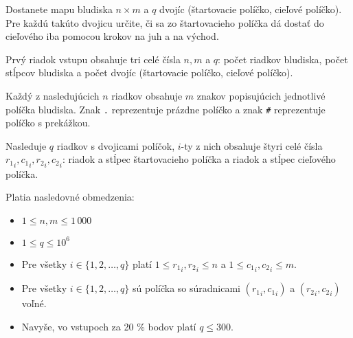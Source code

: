 

Dostanete mapu bludiska $n \times m$ a $q$ dvojíc (štartovacie políčko, cieľové políčko).
Pre každú takúto dvojicu určite, či sa zo štartovacieho políčka dá dostať do cieľového
iba pomocou krokov na juh a na východ.



Prvý riadok vstupu obsahuje tri celé čísla $n, m$ a $q$: počet riadkov bludiska,
počet stĺpcov bludiska a počet dvojíc (štartovacie políčko, cieľové políčko).

Každý z nasledujúcich $n$ riadkov obsahuje $m$ znakov popisujúcich jednotlivé políčka
bludiska. Znak \texttt{.} reprezentuje prázdne políčko a znak \texttt{\#} reprezentuje
políčko s prekážkou.



Nasleduje $q$ riadkov s dvojicami políčok, $i$-ty z nich obsahuje štyri celé čísla
${r_1}_i, {c_1}_i, {r_2}_i, {c_2}_i$: riadok a stĺpec štartovacieho políčka a riadok
a stĺpec cieľového políčka.


\bigskip
Platia nasledovné obmedzenia:
\begin{itemize}

\item $1 \leq n, m \leq 1\,000$
\item $1 \leq q \leq 10^6$
\item Pre všetky $i \in \{ 1, 2, \ldots, q \}$ platí $1 \leq {r_1}_i, {r_2}_i \leq n$
      a $1 \leq {c_1}_i, {c_2}_i \leq m$.
\item Pre všetky $i \in \{ 1, 2, \ldots, q \}$ sú políčka so súradnicami
        $({r_1}_i, {c_1}_i)$ a $({r_2}_i, {c_2}_i)$ voľné.
\item Navyše, vo vstupoch za 20 \% bodov platí $q \leq 300$.
\end{itemize}

